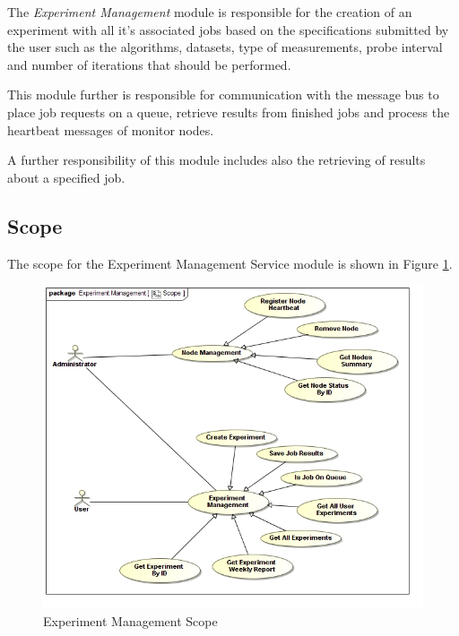 The \textit{Experiment Management} module is responsible for the creation of an
experiment with all it's associated jobs based on the specifications submitted
by the user such as the algorithms, datasets, type of measurements, probe 
interval and number of iterations that should be performed. 

This module further is responsible for communication with the message bus to
place job requests on a queue, retrieve results from finished jobs and process
the heartbeat messages of monitor nodes.

A further responsibility of this module includes also the retrieving of results
about a specified job.



\subsection{Scope}
The scope for the Experiment Management Service module is shown in Figure \ref{fig:experimentManagementScope}.
\begin{figure}[H]
  \begin{center}
  \includegraphics[scale=0.38]{../Diagrams and Charts/Experiment/Scope.jpg}
  \caption{Experiment Management Scope}
  \label{fig:experimentManagementScope}
  \end{center}
\end{figure}



